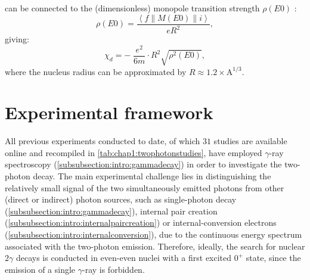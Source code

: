  can be connected to the (dimensionless) monopole transition strength $\rho\left(E0\right)$ \cite{Kibedi-2022}:
\begin{equation}
    \rho\left(E0\right) = \frac{\left\langle f \middle\| M(E0) \middle\| i \right\rangle}{eR^2},
    \label{eq:chap1:rho}
\end{equation}
giving:
\begin{equation}
    \chi_{d}= -\; \frac{e^2}{6m} \cdot R^2 \sqrt{\rho^2\left(E0\right)},
    \label{eq:chap1:chidrho}
\end{equation}
where the nucleus radius can be approximated by $R \approx 1.2 \times \mathrm{A}^{1/3}$.

\section{Experimental framework}\label{sec:chap1:previousexperiments}
All previous experiments conducted to date, of which $31$ studies are available online and recompiled in \cref{tab:chap1:twophotonstudies}, have employed $\gamma$-ray spectroscopy (\cref{subsubsection:intro:gammadecay}) in order to investigate the two-photon decay. 
The main experimental challenge lies in distinguishing the relatively small signal of the two simultaneously emitted photons from other (direct or indirect) photon sources, such as single-photon decay (\cref{subsubsection:intro:gammadecay}), internal pair creation (\cref{subsubsection:intro:internalpaircreation}) or internal-conversion electrons (\cref{subsubsection:intro:internalconversion}), due to the continuous energy spectrum associated with the two-photon emission. Therefore, ideally, the search for nuclear $2\gamma$ decays is conducted in even-even nuclei with a first excited $0^{+}$ state, since the emission of a single $\gamma$-ray is forbidden. 

